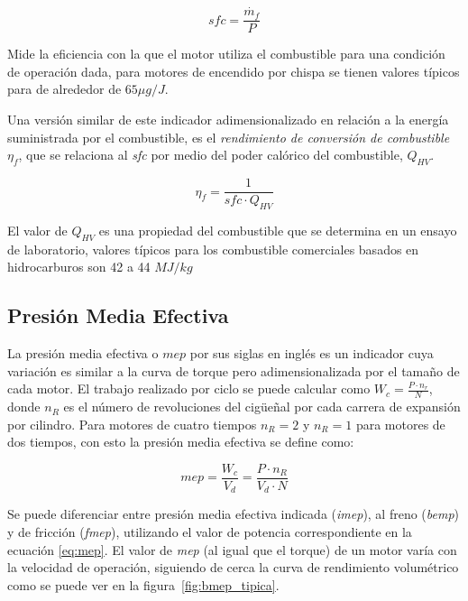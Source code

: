 \begin{equation}\label{eq:sfc} sfc = \frac{\dot{m_f}}{P}
\end{equation}

Mide la eficiencia con la que el motor utiliza el combustible para una condición
de operación dada, para motores de encendido por chispa se tienen valores
típicos para de alrededor de $65\mu g/J$.

Una versión similar de este indicador adimensionalizado en relación a la energía
suministrada por el combustible, es el \emph{rendimiento de conversión de
combustible} $\eta_f$, que se relaciona al \emph{sfc} por medio del poder
calórico del combustible, $Q_{HV}$.

\begin{equation}\label{eq:eta_f} \eta_f = \frac{1}{sfc \cdot Q_{HV}}
\end{equation}

El valor de $Q_{HV}$ es una propiedad del combustible que se determina en un
ensayo de laboratorio, valores típicos para los combustible comerciales basados
en hidrocarburos son 42 a 44 $MJ/kg$


\subsection{Presión Media Efectiva}
%
La presión media efectiva o $mep$ por sus siglas en inglés es un indicador cuya
variación es similar a la curva de torque pero adimensionalizada por el tamaño
de cada motor.
%
El trabajo realizado por ciclo se puede calcular como
$W_c = \frac{P \cdot n_r}{N}$, donde $n_R$ es el número de revoluciones del
cigüeñal por cada carrera de expansión por cilindro.
%
Para motores de cuatro tiempos $n_R=2$ y $n_R=1$ para motores de dos tiempos,
con esto la presión media efectiva se define como:

\begin{equation}\label{eq:mep} mep = \frac{W_{c}}{V_d} = \frac{P \cdot n_R}{V_d \cdot N}
\end{equation}

Se puede diferenciar entre presión media efectiva indicada (\emph{imep}), al
freno (\emph{bemp}) y de fricción (\emph{fmep}), utilizando el valor de potencia
correspondiente en la ecuación \ref{eq:mep}.
%
El valor de \emph{mep} (al igual que el torque) de un motor varía con la
velocidad de operación, siguiendo de cerca la curva de rendimiento volumétrico
como se puede ver en la figura~\ref{fig:bmep_tipica}.

